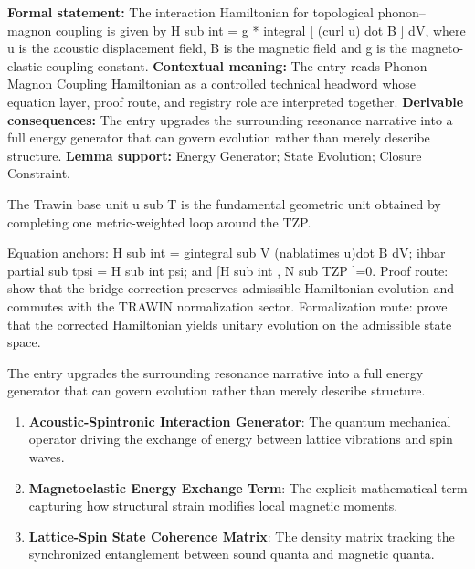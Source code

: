 \begingroup\footnotesize\setlength{\emergencystretch}{3em}\sloppy
\textbf{Formal statement:} The interaction Hamiltonian for topological phonon--magnon coupling is given by H sub int = g * integral [ (curl u) dot B ] dV, where u is the acoustic displacement field, B is the magnetic field and g is the magneto-elastic coupling constant. \textbf{Contextual meaning:} The entry reads Phonon--Magnon Coupling Hamiltonian as a controlled technical headword whose equation layer, proof route, and registry role are interpreted together. \textbf{Derivable consequences:} The entry upgrades the surrounding resonance narrative into a full energy generator that can govern evolution rather than merely describe structure. \textbf{Lemma support:} Energy Generator; State Evolution; Closure Constraint.\par
\endgroup

The Trawin base unit u sub T is the fundamental geometric unit obtained by completing one metric-weighted loop around the TZP.

Equation anchors: H sub int = gintegral sub V (nablatimes u)dot B dV; ihbar partial sub tpsi = H sub int psi; and [H sub int , N sub TZP ]=0. Proof route: show that the bridge correction preserves admissible Hamiltonian evolution and commutes with the TRAWIN normalization sector. Formalization route: prove that the corrected Hamiltonian yields unitary evolution on the admissible state space.

The entry upgrades the surrounding resonance narrative into a full energy generator that can govern evolution rather than merely describe structure.
\endgroup

\begin{enumerate}[leftmargin=1.6em,itemsep=6pt,topsep=4pt]
\item \textbf{Acoustic-Spintronic Interaction Generator}: The quantum mechanical operator driving the exchange of energy between lattice vibrations and spin waves.
\item \textbf{Magnetoelastic Energy Exchange Term}: The explicit mathematical term capturing how structural strain modifies local magnetic moments.
\item \textbf{Lattice-Spin State Coherence Matrix}: The density matrix tracking the synchronized entanglement between sound quanta and magnetic quanta.
\end{enumerate}

